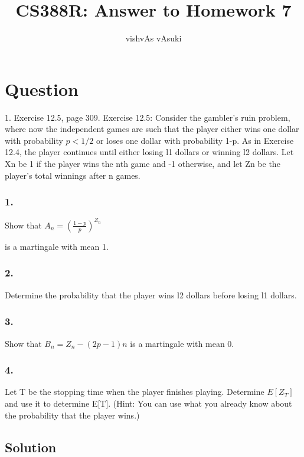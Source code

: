 \documentclass[10pt]{amsart}
\title{CS388R: Answer to Homework 7}
\author{vishvAs vAsuki}
\theoremstyle{remark}
\begin{document}
\maketitle

\section{Question}
1. Exercise 12.5, page 309. Exercise 12.5: Consider the gambler's ruin problem, where now the independent games are such that the player either wins one dollar with probability $p<1/2$ or loses one dollar with probability 1-p. As in Exercise 12.4, the player continues until either losing l1 dollars or winning l2 dollars. Let Xn be 1 if the player wins the nth game and -1 otherwise, and let Zn be the player's total winnings after n games.

\subsubsection{1.}

Show that
$A_{n}=(\frac{1-p}{p})^{Z_{n}}$

is a martingale with mean 1.

\subsubsection{2.}Determine the probability that the player wins l2 dollars before losing l1 dollars.

\subsubsection{3.}Show that
$B_{n}=Z_{n}-(2p-1)n$
is a martingale with mean 0.
\subsubsection{4.}Let T be the stopping time when the player finishes playing. Determine $E[Z_{T}]$ and use it to determine E[T]. (Hint: You can use what you already know about the probability that the player wins.)


\subsection{Solution}
\end{document}
